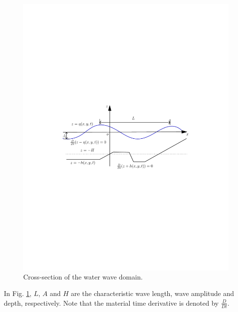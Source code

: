 \begin{figure}[!htb]
{\centering
\includegraphics[width=\largewidth]{chapters/lopes/pdf/graph.pdf}
\caption{Cross-section of the water wave domain.}\label{lopes:fig:schematic}
\par}
\end{figure}
In Fig. \ref{lopes:fig:schematic}, \(L\), \(A\) and \(H\) are
the characteristic wave length, wave amplitude and
depth, respectively. Note that the material time derivative is
denoted by \(\frac{D}{D t}\).

